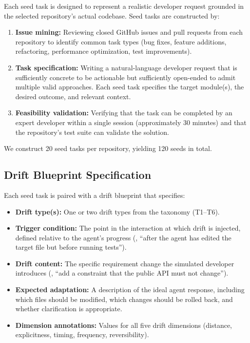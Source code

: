 Each seed task is designed to represent a realistic developer request grounded in the selected repository's actual codebase. Seed tasks are constructed by:

\begin{enumerate}[leftmargin=*, itemsep=2pt]
    \item \textbf{Issue mining:} Reviewing closed GitHub issues and pull requests from each repository to identify common task types (bug fixes, feature additions, refactoring, performance optimization, test improvements).
    \item \textbf{Task specification:} Writing a natural-language developer request that is sufficiently concrete to be actionable but sufficiently open-ended to admit multiple valid approaches. Each seed task specifies the target module(s), the desired outcome, and relevant context.
    \item \textbf{Feasibility validation:} Verifying that the task can be completed by an expert developer within a single session (approximately 30 minutes) and that the repository's test suite can validate the solution.
\end{enumerate}

\noindent We construct 20 seed tasks per repository, yielding 120 seeds in total.

\subsection{Drift Blueprint Specification}

Each seed task is paired with a drift blueprint that specifies:

\begin{itemize}[leftmargin=*, itemsep=2pt]
    \item \textbf{Drift type(s):} One or two drift types from the taxonomy (T1--T6).
    \item \textbf{Trigger condition:} The point in the interaction at which drift is injected, defined relative to the agent's progress (\eg, ``after the agent has edited the target file but before running tests'').
    \item \textbf{Drift content:} The specific requirement change the simulated developer introduces (\eg, ``add a constraint that the public API must not change'').
    \item \textbf{Expected adaptation:} A description of the ideal agent response, including which files should be modified, which changes should be rolled back, and whether clarification is appropriate.
    \item \textbf{Dimension annotations:} Values for all five drift dimensions (distance, explicitness, timing, frequency, reversibility).
\end{itemize}


